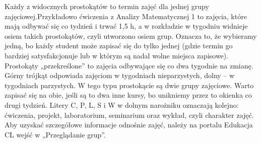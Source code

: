 \documentclass[11pt]{article}
\begin{document}

\vspace{0.1cm}

Każdy z widocznych prostokątów to termin zajęć dla jednej grupy zajęciowej.\linebreak Przykładowo ćwiczenia z Analizy Matematycznej 1 to zajęcia, które mają odbywać się co tydzień i trwać 1,5 h, a w rozkładzie w tygodniu widnieje osiem takich prostokątów, czyli utworzono osiem grup. Oznacza to, że wybieramy jedną, bo każdy student może zapisać się do tylko jednej (gdzie termin go bardziej satysfakcjonuje lub w którym są nadal wolne miejsca zapisowe). Prostokąty „przekreślone” to zajęcia odbywające się co dwa tygodnie na zmianę. Górny trójkąt odpowiada zajęciom w tygodniach nieparzystych, dolny – w tygodniach parzystych. \linebreak W tego typu prostokącie są dwie grupy zajęciowe. Warto zapisać się na obie, jeśli są to dwa inne kursy, bo unikniemy przez to okienka co drugi tydzień. Litery C, P, L, S i W w dolnym narożniku oznaczają kolejno: ćwiczenia, projekt, laboratorium, seminarium oraz wykład, czyli charakter zajęć. Aby uzyskać szczegółowe informacje odnośnie zajęć, należy na portalu Edukacja CL wejść w „Przeglądanie grup”.
\end{document}
